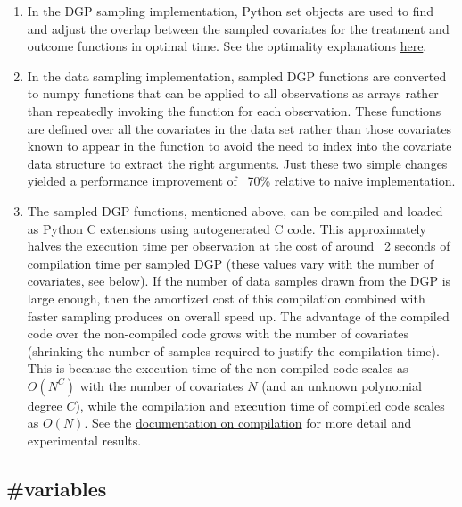 \documentclass[./main.tex]{subfiles}
\begin{document}
\begin{enumerate}
    \item In the DGP sampling implementation, Python set objects are used to find and adjust the overlap between the sampled covariates for the treatment and outcome functions in optimal time. See the optimality explanations \href{https://wiki.python.org/moin/TimeComplexity}{here}.
    
    \item In the data sampling implementation, sampled DGP functions are converted to numpy functions that can be applied to all observations as arrays rather than repeatedly invoking the function for each observation. These functions are defined over all the covariates in the data set rather than those covariates known to appear in the function to avoid the need to index into the covariate data structure to extract the right arguments. Just these two simple changes yielded a performance improvement of ~70\% relative to naive implementation.
    
    \item The sampled DGP functions, mentioned above, can be compiled and loaded as Python C extensions using autogenerated C code. This approximately halves the execution time per observation at the cost of around ~2 seconds of compilation time per sampled DGP (these values vary with the number of covariates, see below). If the number of data samples drawn from the DGP is large enough, then the amortized cost of this compilation combined with faster sampling produces on overall speed up. The advantage of the compiled code over the non-compiled code grows with the number of covariates (shrinking the number of samples required to justify the compilation time). This is because the execution time of the non-compiled code scales as $O(N^C)$ with the number of covariates $N$ (and an unknown polynomial degree $C$), while the compilation and execution time of compiled code scales as $O(N)$. See the \href{\RTDurl/advanced/parallelization.html}{documentation on compilation} for more detail and experimental results.
    
\end{enumerate}


\subsection*{\textbf{\#variables}}
\label{hc:variables}
\end{document}
